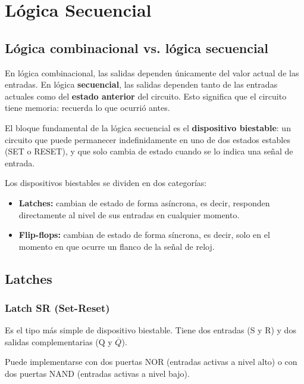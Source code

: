 \chapter{Lógica Secuencial}

\section{Lógica combinacional vs. lógica secuencial}

En lógica combinacional, las salidas dependen únicamente del valor actual de las entradas. En lógica \textbf{secuencial}, las salidas dependen tanto de las entradas actuales como del \textbf{estado anterior} del circuito. Esto significa que el circuito tiene memoria: recuerda lo que ocurrió antes.

El bloque fundamental de la lógica secuencial es el \textbf{dispositivo biestable}: un circuito que puede permanecer indefinidamente en uno de dos estados estables (SET o RESET), y que solo cambia de estado cuando se lo indica una señal de entrada.

Los dispositivos biestables se dividen en dos categorías:

\begin{itemize}
    \item \textbf{Latches:} cambian de estado de forma asíncrona, es decir, responden directamente al nivel de sus entradas en cualquier momento.
    \item \textbf{Flip-flops:} cambian de estado de forma síncrona, es decir, solo en el momento en que ocurre un flanco de la señal de reloj.
\end{itemize}

\section{Latches}

\subsection{Latch SR (Set-Reset)}

Es el tipo más simple de dispositivo biestable. Tiene dos entradas (S y R) y dos salidas complementarias (Q y $\overline{Q}$).

Puede implementarse con dos puertas NOR (entradas activas a nivel alto) o con dos puertas NAND (entradas activas a nivel bajo).


